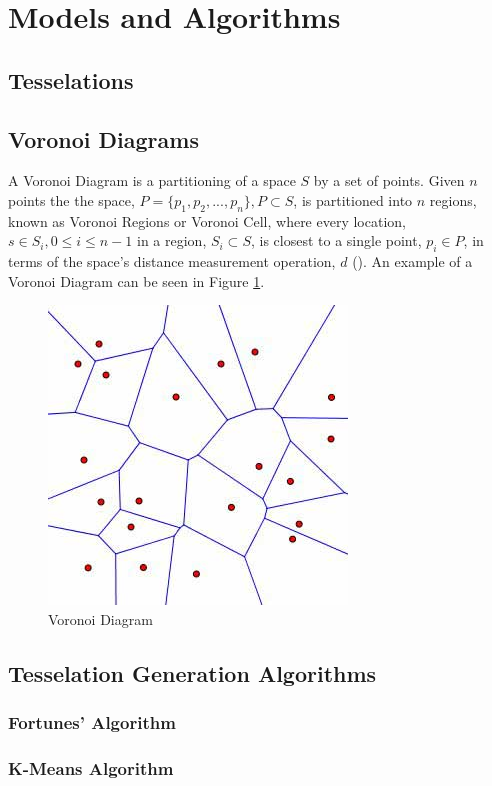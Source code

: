 \section{Models and Algorithms}\label{tes}
\subsection{Tesselations}\label{tes:sec:tess}
\subsection{Voronoi Diagrams}\label{tes:sec:vor}
A Voronoi Diagram is a partitioning of a space $S$ by a set of points. Given $n$ points the the space, $P = \{p_1,p_2,...,p_n\}, P \subset S$, is partitioned into $n$ regions, known as Voronoi Regions or Voronoi Cell, where every location, $s \in S_i,0 \leq i \leq n-1$ in a region, $S_i \subset S$, is closest to a single point, $p_i \in P$, in terms of the space's distance measurement operation, $d$ (\cite{okabe2009spatial}). An example of a Voronoi Diagram can be seen in Figure \ref{tes:fig:voreg}.
\begin{figure}[H]
	\centering
    \label{tes:fig:voreg}
    \includegraphics[scale=0.65]{Images/voronoi.jpg}
    \caption{Voronoi Diagram\cite{voronoipic}}
\end{figure}
\subsection{Tesselation Generation Algorithms}\label{tes:sec:tga}
%
\subsubsection{Fortunes' Algorithm}\label{tes:ssec:fort}
%
\subsubsection{K-Means Algorithm}\label{tes:ssec:kma}
